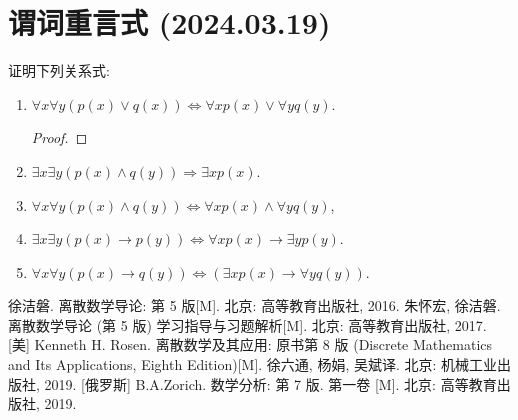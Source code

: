 \documentclass[10pt,UTF8]{ctexbook} %
\begin{document}
\section{谓词重言式 (2024.03.19)}

\begin{exercise}
    证明下列关系式:
    \begin{enumerate}[label={$\left(\arabic*\right)$}, itemsep=0pt]
        \item $\forall x \forall y \left(
            p(x) \vee q(x)
        \right) \iff \forall x p(x) \vee \forall y q(y)$.
        \begin{proof}
            
        \end{proof}
        \item $\exists x \exists y \left(
            p(x) \wedge q(y)
        \right) \Longrightarrow \exists x p(x)$.
        \item $\forall x \forall y \left(
            p(x) \wedge q(y)
        \right) \iff \forall x p(x) \wedge \forall y q(y)$,
        \item $\exists x \exists y \left(
            p(x) \rightarrow p(y)
        \right) \iff \forall x p(x) \to \exists y p(y)$.
        \item $\forall x \forall y \left(
            p(x) \to q(y)
        \right) \iff \left(
            \exists x p(x) \to \forall y q(y)
        \right)$.
    \end{enumerate}
\end{exercise}




\onecolumn
\begin{thebibliography}{1}
    徐洁磐. 离散数学导论: 第 5 版[M]. 北京: 高等教育出版社, 2016.
    朱怀宏, 徐洁磐. 离散数学导论 (第 5 版) 学习指导与习题解析[M].
    北京: 高等教育出版社, 2017.
    [美] Kenneth H. Rosen. 离散数学及其应用: 原书第 8 版 (Discrete Mathematics 
    and Its Applications, Eighth Edition)[M]. 徐六通, 杨娟, 吴斌译.
    北京: 机械工业出版社, 2019.
    [俄罗斯] B.A.Zorich. 数学分析: 第 7 版. 第一卷 [M].
    北京: 高等教育出版社, 2019.
\end{thebibliography}

\end{document}
